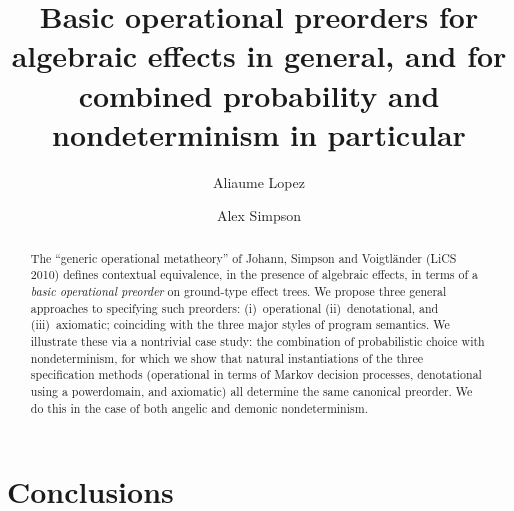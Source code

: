\documentclass[a4paper,UKenglish]{lipics-v2018}
\title{Basic operational preorders  for algebraic effects in general, and for
combined probability and nondeterminism in particular}
\author{Aliaume Lopez}{\'Ecole Normale Sup\'erieure Paris-Saclay\\{Universit\'e Paris-Saclay, France}}{aliaume.lopez@ens-paris-saclay.fr}{}{}%
\author{Alex Simpson}{Faculty of Mathematics and Physics\\{University of Ljubljana, Slovenia}}{Alex.Simpson@fmf.uni-lj.si}{}{Research supported by: [[TO COMPLETE]]}
\theoremstyle{plain}
\begin{document}
\maketitle

\begin{abstract}
The ``generic operational metatheory'' of  Johann, Simpson and Voigtl\"{a}nder (LiCS 2010) defines
contextual equivalence, 
in the presence of algebraic effects, in terms of a
\emph{basic operational preorder} on ground-type effect trees. We propose three general approaches to 
specifying such preorders: (i)~operational (ii)~denotational, and (iii)~axiomatic; coinciding with the three major styles of program semantics. We illustrate these via a nontrivial case study: the combination of probabilistic choice with nondeterminism, for which we show that  natural instantiations of the three specification methods (operational in terms of Markov decision processes, denotational using  a powerdomain, and axiomatic) all determine the same canonical preorder. We do this in the case of both angelic and demonic nondeterminism. 
 \end{abstract}

















\section{Conclusions}
\label{section:conclusions}




\end{document}
